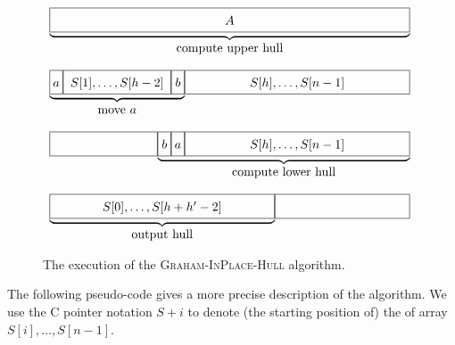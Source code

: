 \documentclass{elsart}
\begin{document}
\begin{figure}
\begin{center}
$\begin{array}{c}
   \underbrace{\framebox[4in]{\fillit $A$}} \\
   \mbox{compute upper hull}
\end{array}$

\vspace{2ex}


$\begin{array}{c@{}c@{}c@{}c@{}c}
   \underbrace{\framebox[.15in]{\fillit $a$}
	\framebox[1.2in]{\fillit $S[1],\ldots,S[h-2]$}
	\framebox[.15in]{\fillit $b$}}
	& {\framebox[2.5in]{\fillit $S[h],\ldots,S[n-1]$}} \\
   \mbox{move $a$} & 
\end{array}$

\vspace{2ex}

$\begin{array}{c@{}c@{}c@{}c}
   \framebox[1.2in]{\fillit} 
      & \underbrace{\framebox[.15in]{\fillit $b$}
      \framebox[.15in]{\fillit $a$}
	\framebox[2.5in]{\fillit $S[h],\ldots,S[n-1]$}} \\
   	& \mbox{compute lower hull} \\
\end{array}$

\vspace{2ex}

$\begin{array}{c@{}c@{}c@{}c}
   \underbrace{\framebox[2.5in]{\fillit $S[0],\ldots,S[h+h'-2]$}} 
	& \framebox[1.5in]{\fillit} \\
	\mbox{output hull}
\end{array}$

\end{center}
\caption{The execution of the \textsc{Graham-InPlace-Hull} algorithm.}
\end{figure}

The following pseudo-code gives a more precise description of the
algorithm.  We use the C pointer notation $S+i$ to denote (the
starting position of) the of array $S[i],\ldots,S[n-1]$.
\end{document}
